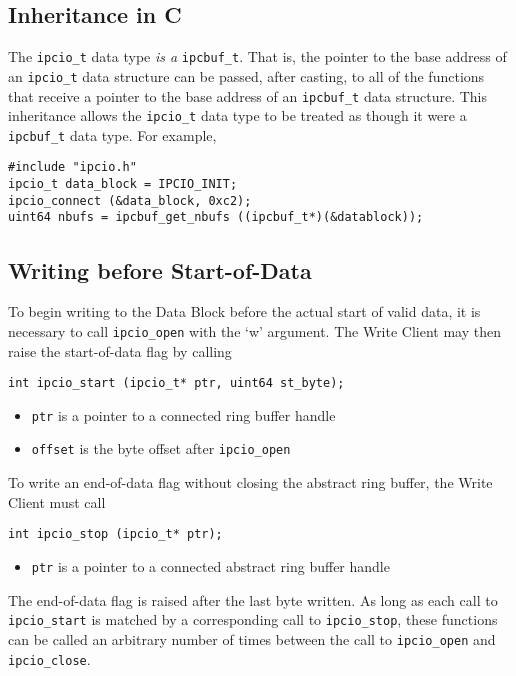 \subsection{Inheritance in C}

The {\tt ipcio\_t} data type {\em is a} {\tt ipcbuf\_t}.  That is, the
pointer to the base address of an {\tt ipcio\_t} data structure can be
passed, after casting, to all of the functions that receive a pointer
to the base address of an {\tt ipcbuf\_t} data structure.  This
inheritance allows the {\tt ipcio\_t} data type to be treated as
though it were a {\tt ipcbuf\_t} data type. For example,
\begin{verbatim}
#include "ipcio.h"
ipcio_t data_block = IPCIO_INIT;
ipcio_connect (&data_block, 0xc2);
uint64 nbufs = ipcbuf_get_nbufs ((ipcbuf_t*)(&datablock));
\end{verbatim}

\subsection{Writing before Start-of-Data}

To begin writing to the Data Block before the actual start of valid data, 
it is necessary to call {\tt ipcio\_open} with the `w' argument.
The Write Client may then raise the start-of-data flag by calling
\begin{verbatim}
int ipcio_start (ipcio_t* ptr, uint64 st_byte);
\end{verbatim}
\vspace{-3mm}
\begin{itemize}
\item {\tt ptr} is a pointer to a connected ring buffer handle
\item {\tt offset} is the byte offset after {\tt ipcio\_open}
\end{itemize}
To write an end-of-data flag without closing
the abstract ring buffer, the Write Client must call
\begin{verbatim}
int ipcio_stop (ipcio_t* ptr);
\end{verbatim}
\vspace{-3mm}
\begin{itemize}
\item {\tt ptr} is a pointer to a connected abstract ring buffer handle
\end{itemize}
The end-of-data flag is raised after the last byte written.  
As long as each call to {\tt ipcio\_start} is matched by a corresponding
call to {\tt ipcio\_stop}, these functions can be called an arbitrary
number of times between the call to {\tt ipcio\_open} 
and {\tt ipcio\_close}.


